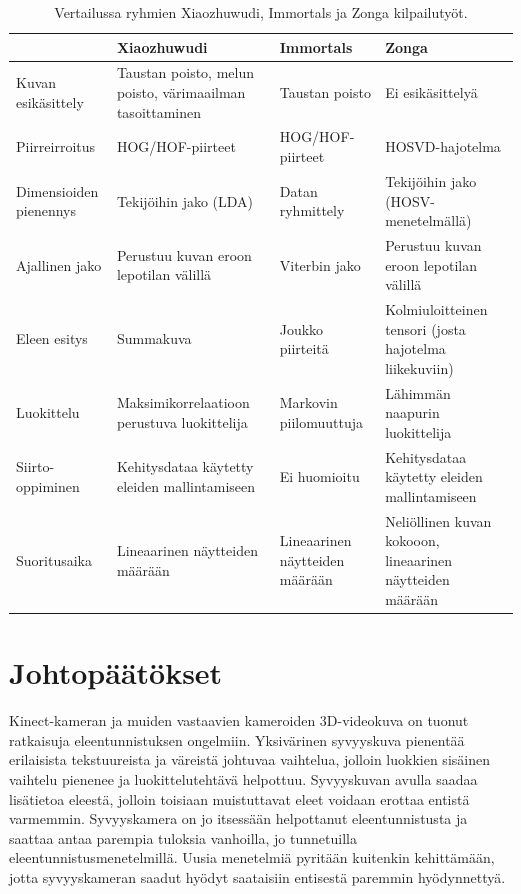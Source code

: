 \begin{table}[th]
\caption{Vertailussa ryhmien Xiaozhuwudi, Immortals ja Zonga kilpailutyöt. \citep{firstround}}
\label{table:kolmetyötä}
\begin{center}
\begin{tabular}{|p{}|p{}|p{}|p{}|} 
    \hline
 & Xiaozhuwudi & Immortals & Zonga\\
    \hline
    \hline
 Kuvan esikäsittely & Taustan poisto, melun poisto, värimaailman tasoittaminen& Taustan poisto & Ei esikäsittelyä\\
    \hline
 Piirreirroitus & HOG/HOF-piirteet & HOG/HOF-piirteet & HOSVD-hajotelma \\
    \hline
 Dimensioiden pienennys & Tekijöihin jako (LDA)& Datan ryhmittely & Tekijöihin jako (HOSV-menetelmällä)\\
    \hline	
 Ajallinen jako &Perustuu kuvan eroon lepotilan välillä &Viterbin jako &Perustuu kuvan eroon lepotilan välillä\\
     \hline
 Eleen esitys &Summakuva &Joukko piirteitä &Kolmiuloitteinen tensori (josta hajotelma liikekuviin)\\
     \hline
 Luokittelu &Maksimikorrelaatioon perustuva luokittelija &Markovin piilomuuttuja &Lähimmän naapurin luokittelija\\
      \hline
 Siirto-oppiminen &Kehitysdataa käytetty eleiden mallintamiseen&Ei huomioitu&Kehitysdataa käytetty eleiden mallintamiseen\\
      \hline
 Suoritusaika &Lineaarinen näytteiden määrään&Lineaarinen näytteiden määrään &Neliöllinen kuvan kokooon, lineaarinen näytteiden määrään\\
      \hline
	  \hline
\end{tabular}
\end{center}
\end{table}

\section {Johtopäätökset}

Kinect-kameran ja muiden vastaavien kameroiden 3D-videokuva on tuonut ratkaisuja eleentunnistuksen ongelmiin. Yksivärinen syvyyskuva pienentää erilaisista tekstuureista
ja väreistä johtuvaa vaihtelua, jolloin luokkien sisäinen vaihtelu pienenee ja luokittelutehtävä helpottuu. Syvyyskuvan avulla
saadaa lisätietoa eleestä, jolloin toisiaan muistuttavat eleet voidaan erottaa entistä varmemmin. Syvyyskamera on jo itsessään
helpottanut eleentunnistusta ja saattaa antaa parempia tuloksia vanhoilla, jo tunnetuilla eleentunnistusmenetelmillä. Uusia menetelmiä
pyritään kuitenkin kehittämään, jotta syvyyskameran saadut hyödyt saataisiin entisestä paremmin hyödynnettyä.\\

